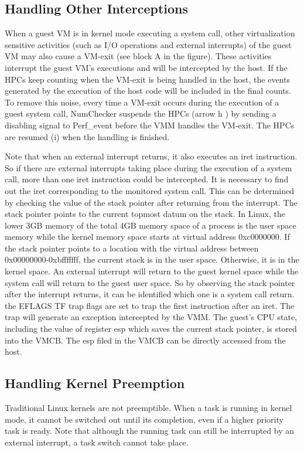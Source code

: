 \documentclass[12pt]{report}
\begin{document}
\subsection{Handling Other Interceptions}
When a guest VM is
in kernel mode executing a system call, other virtualization sensitive
activities (such as I/O operations and external interrupts)
of the guest VM may also cause a VM-exit (see
block A in the figure). These activities interrupt the guest VM’s
executions and will be intercepted by the host. If the HPCs
keep counting when the VM-exit is being handled in the host,
the events generated by the execution of the host code will
be included in the final counts. To remove this noise, every
time a VM-exit occurs during the execution of a guest system
call, NumChecker suspends the HPCs (arrow h )
by sending a disabling signal to Perf\_event before the VMM
handles the VM-exit. The HPCs are resumed (i) when the
handling is finished.

Note that when an external interrupt returns, it also executes
an iret instruction. So if there are external interrupts taking
place during the execution of a system call, more than one
iret instruction could be intercepted. It is necessary to find
out the iret corresponding to the monitored system call.
This can be determined by checking the value of the stack
pointer after returning from the interrupt. The stack pointer
points to the current topmost datum on the stack. In Linux,
the lower 3GB memory of the total 4GB memory space of a
process is the user space memory while the kernel memory
space starts at virtual address 0xc0000000. If the stack
pointer points to a location with the virtual address between
0x00000000-0xbfffffff, the current stack is in the user
space. Otherwise, it is in the kernel space. An external interrupt
will return to the guest kernel space while the system call
will return to the guest user space. So by observing the stack
pointer after the interrupt returns, it can be identified which one
is a system call return. the EFLAGS TF trap flags are set to
trap the first instruction after an iret. The trap will generate
an exception intercepted by the VMM. The guest’s CPU state,
including the value of register esp which saves the current
stack pointer, is stored into the VMCB. The esp filed in the
VMCB can be directly accessed from the host.


\subsection{Handling Kernel Preemption}
Traditional Linux kernels
are not preemptible. When a task is running in kernel mode, it
cannot be switched out until its completion, even if a higher priority
task is ready. Note that although the running task
can still be interrupted by an external interrupt, a task switch
cannot take place.
\end{document}
